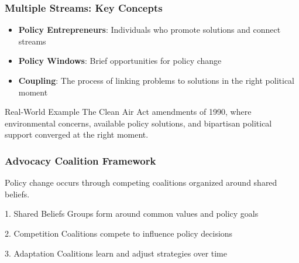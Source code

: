 \documentclass[10pt]{beamer}
\begin{document}
\begin{frame}
\frametitle{Multiple Streams: Key Concepts}

\begin{itemize}
  \item \textbf{Policy Entrepreneurs}: Individuals who promote solutions and connect streams
  \item \textbf{Policy Windows}: Brief opportunities for policy change  
  \item \textbf{Coupling}: The process of linking problems to solutions in the right political moment
\end{itemize}

\vspace{0.5cm}

\begin{alertblock}{Real-World Example}
The Clean Air Act amendments of 1990, where environmental concerns, available policy solutions, and bipartisan political support converged at the right moment.
\end{alertblock}

\end{frame}

\begin{frame}
\frametitle{Advocacy Coalition Framework}

Policy change occurs through competing coalitions organized around shared beliefs.

\vspace{0.5cm}

\begin{block}{1. Shared Beliefs}
Groups form around common values and policy goals
\end{block}

\begin{block}{2. Competition}
Coalitions compete to influence policy decisions
\end{block}

\begin{block}{3. Adaptation}
Coalitions learn and adjust strategies over time
\end{block}

\end{frame}
\end{document}
